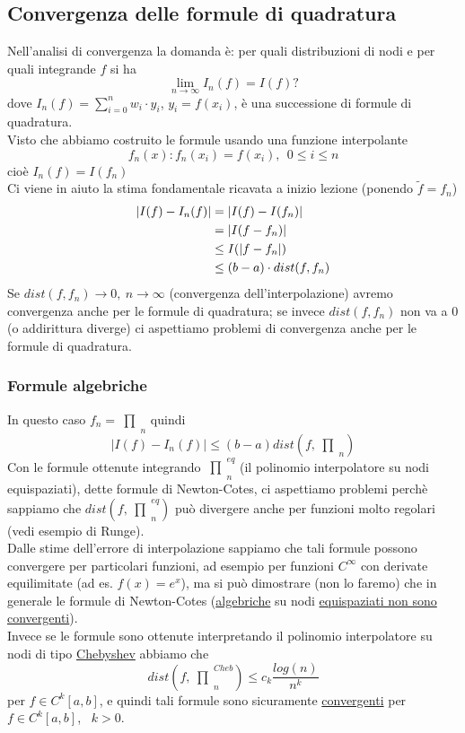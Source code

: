 \documentclass[12pt,a4paper]{article}
\DeclarePairedDelimiter{\abs}{\lvert}{\rvert}
\newcommand{\inter}{\begin{matrix}\prod\end{matrix}}
\begin{document}
\subsection{Convergenza delle formule di quadratura}
Nell'analisi di convergenza la domanda è: per quali distribuzioni di nodi e per quali integrande $f$ si ha
\[
\lim_{n \to \infty} I_n (f) = I(f) ?
\]
dove $I_n(f) = \sum_{i=0}^n w_i \cdot y_i$, $y_i = f(x_i)$, è una successione di formule di quadratura.\\
Visto che abbiamo costruito le formule usando una funzione interpolante
\[
f_n(x): f_n(x_i) = f(x_i), \ \ 0 \le i \le n
\]
cioè $I_n(f) = I(f_n)$\\
Ci viene in aiuto la stima fondamentale ricavata a inizio lezione (ponendo $\tilde{f} = f_n$)
\[
\begin{split}
\abs{I(f) - I_n(f)} & = \abs{I(f) - I(f_n)} \\
& = \abs{I(f - f_n)} \\
& \le I(\abs{f - f_n}) \\
& \le (b-a) \cdot dist(f, f_n)
\end{split}
\]
Se $dist(f, f_n) \to 0, \ n \to \infty$ (convergenza dell'interpolazione) avremo convergenza anche per le formule di quadratura; se invece $dist(f, f_n)$ non va a 0 (o addirittura diverge) ci aspettiamo problemi
di convergenza anche per le formule di quadratura.

\subsubsection{Formule algebriche}
In questo caso $f_n=\inter_n$ quindi 
\begin{equation*}
    |I(f)-I_n(f)|\leq(b-a)dist(f,\inter_n)
\end{equation*}
Con le formule ottenute integrando $\inter_n^{eq}$ (il polinomio interpolatore su nodi equispaziati), dette formule di Newton-Cotes, ci aspettiamo problemi perchè sappiamo che $dist(f,\inter_n^{eq})$ può divergere anche per funzioni molto regolari (vedi esempio di Runge).\\
Dalle stime dell'errore di interpolazione sappiamo che tali formule possono convergere per particolari funzioni, ad esempio per funzioni $C^{\infty}$ con derivate equilimitate (ad es. $f(x)=e^x$), ma si può dimostrare (non lo faremo) che in generale le formule di Newton-Cotes (\uline{algebriche} su nodi \uline{equispaziati non sono convergenti}).\\ Invece se le formule sono ottenute interpretando il polinomio interpolatore su nodi di tipo \uline{Chebyshev} abbiamo che \\
\begin{equation*}
    dist(f,\inter_n^{Cheb})\leq c_k\frac{log(n)}{n^k}
\end{equation*}
per $f\in C^k[a,b]$, e quindi tali formule sono sicuramente \uline{convergenti} per $f\in C^k[a,b]$, \ $k>0$.
\end{document}

